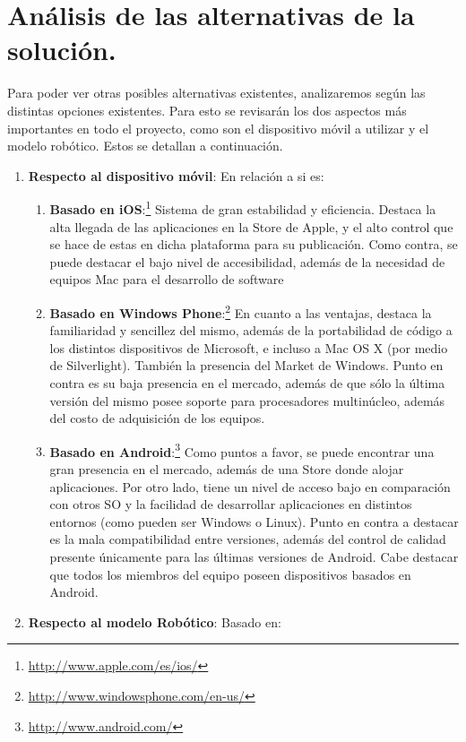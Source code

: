 \newpage
\section{An\'alisis de las alternativas de la soluci\'on.}

Para poder ver otras posibles alternativas existentes, analizaremos seg\'un las distintas opciones existentes. Para esto se revisar\'an los dos aspectos m\'as importantes en todo el proyecto, como son el dispositivo m\'ovil a utilizar y el modelo rob\'otico. Estos se detallan a continuaci\'on.
\begin{enumerate}
\item {\bf Respecto al dispositivo m\'ovil}: En relaci\'on a si es:
  \begin{enumerate}
  \item {\bf Basado en iOS}:\footnote{\url{http://www.apple.com/es/ios/}} Sistema de gran estabilidad y eficiencia. Destaca la alta llegada de las aplicaciones en la Store de Apple, y el alto control que se hace de estas en dicha plataforma para su publicaci\'on. Como contra, se puede destacar el bajo nivel de accesibilidad, adem\'as de la necesidad de equipos Mac para el desarrollo de software
  \item {\bf Basado en Windows Phone}:\footnote{\url{http://www.windowsphone.com/en-us/}} En cuanto a las ventajas, destaca la familiaridad y sencillez del mismo, adem\'as de la portabilidad de c\'odigo a los distintos dispositivos de Microsoft, e incluso a Mac OS X (por medio de Silverlight). Tambi\'en la presencia del Market de Windows. Punto en contra es su baja presencia en el mercado, adem\'as de que s\'olo la \'ultima versi\'on del mismo posee soporte para procesadores multin\'ucleo, adem\'as del costo de adquisici\'on de los equipos.
  \item {\bf Basado en Android}:\footnote{\url{http://www.android.com/}} Como puntos a favor, se puede encontrar una gran presencia en el mercado, adem\'as de una Store donde alojar aplicaciones. Por otro lado, tiene un nivel de acceso bajo en comparaci\'on con otros SO y la facilidad de desarrollar aplicaciones en distintos entornos (como pueden ser Windows o Linux). Punto en contra a destacar es la mala compatibilidad entre versiones, adem\'as del control de calidad presente \'unicamente para las \'ultimas versiones de Android. Cabe destacar que todos los miembros del equipo poseen dispositivos basados en Android.
  \end{enumerate}
\item {\bf Respecto al modelo Rob\'otico}: Basado en:

\end{enumerate}
